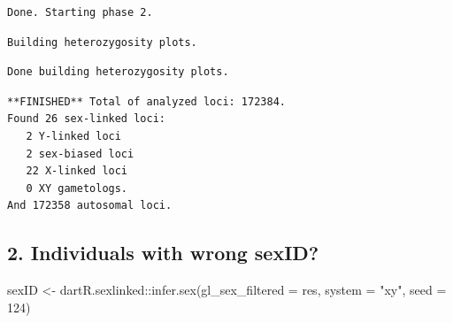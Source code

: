 \documentclass[
  letterpaper,
  DIV=11,
  numbers=noendperiod]{scrreprt}
\newenvironment{Shaded}{\begin{snugshade}}{\end{snugshade}}
\newcommand{\AttributeTok}[1]{\textcolor[rgb]{0.49,0.56,0.16}{#1}}
\newcommand{\DecValTok}[1]{\textcolor[rgb]{0.25,0.63,0.44}{#1}}
\newcommand{\FunctionTok}[1]{\textcolor[rgb]{0.02,0.16,0.49}{#1}}
\newcommand{\NormalTok}[1]{\textcolor[rgb]{0.00,0.44,0.13}{#1}}
\newcommand{\OtherTok}[1]{\textcolor[rgb]{0.00,0.44,0.13}{#1}}
\newcommand{\SpecialCharTok}[1]{\textcolor[rgb]{0.25,0.44,0.63}{#1}}
\newcommand{\StringTok}[1]{\textcolor[rgb]{0.25,0.44,0.63}{#1}}
\let\textttOrig\texttt
\renewcommand{\texttt}[1]{\textttOrig{\color{blue}{#1}}}
\begin{document}
\begin{verbatim}
Done. Starting phase 2.
\end{verbatim}

\begin{verbatim}
Building heterozygosity plots.
\end{verbatim}

\begin{figure}[H]

{\centering \texttt{[image: Session10\_SexLinkedMarkers\_files/figure-pdf/unnamed-chunk-22-2.pdf]}

}

\end{figure}

\begin{figure}[H]

{\centering \texttt{[image: Session10\_SexLinkedMarkers\_files/figure-pdf/unnamed-chunk-22-3.pdf]}

}

\end{figure}

\begin{verbatim}
Done building heterozygosity plots.
\end{verbatim}

\begin{verbatim}
**FINISHED** Total of analyzed loci: 172384.
Found 26 sex-linked loci:
   2 Y-linked loci
   2 sex-biased loci
   22 X-linked loci
   0 XY gametologs.
And 172358 autosomal loci.
\end{verbatim}

\begin{figure}[H]

{\centering \texttt{[image: Session10\_SexLinkedMarkers\_files/figure-pdf/unnamed-chunk-22-4.pdf]}

}

\end{figure}

\hypertarget{individuals-with-wrong-sexid-3}{%
\subsection*{2. Individuals with wrong
sexID?}\label{individuals-with-wrong-sexid-3}}

\begin{Shaded}
\begin{Highlighting}[]
\NormalTok{sexID }\OtherTok{\textless{}{-}}\NormalTok{ dartR.sexlinked}\SpecialCharTok{::}\FunctionTok{infer.sex}\NormalTok{(}\AttributeTok{gl\_sex\_filtered =}\NormalTok{ res, }\AttributeTok{system =} \StringTok{"xy"}\NormalTok{,}
    \AttributeTok{seed =} \DecValTok{124}\NormalTok{)}
\end{Highlighting}
\end{Shaded}
\end{document}
